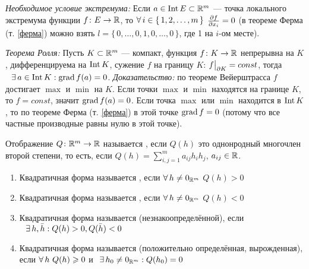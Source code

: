 \begin{slv}[https://www.youtube.com/live/oGN0SkfpZME?si=B74TnyBQXKKDpNlM&t=1691]
	\textit{Необходимое условие экстремума:} Если $a \in \mathrm{Int}\, E \subset \mathbb R^m$ --- точка локального экстремума функции $f\colon E \to \mathbb R$, то $\forall \, i \in \{\, 1, 2, \ldots, m \,\}$ $\frac{\partial f}{\partial x_i} = 0$ (в теореме Ферма (т. \ref{ферма}) можно взять $l = \{\,0, \ldots, 0, 1, 0, \ldots, 0\,\}$, где 1 на $i$-ом месте).
\end{slv}

\begin{slv}[https://www.youtube.com/live/oGN0SkfpZME?si=icr0a6IMCeINfjyk&t=1790]
	\textit{Теорема Ролля:} Пусть $K \subset \mathbb R^m$ --- компакт, функция $f \colon K \to \mathbb R$ непрерывна на $K$, дифференцируема на $\mathrm{Int}\, K$, сужение $f$ на границу $K$: $f\big|_{\partial K}^{} = const$, \smallskip тогда$\E a \in \Int K : \grad f(a) = 0$.\linebreak
	\textit{Доказательство:} по теореме Вейерштрасса $f$ достигает $\max$ и $\min$ на $K$. Если точки $\max$ и $\min$ находятся на границе $K$, то $f = const$, значит $\mathrm{grad\,} f(a) = 0$. Если точка $\max$ или $\min$ находится в $\mathrm{Int}\, K$, то по теореме Ферма (т. \ref{ферма}) в этой точке $\mathrm{grad\,} f = 0$ (потому что все частные производные равны нулю в этой точке). 
\end{slv}

\begin{opr}
	Отображение $Q \colon \mathbb R^m \to \mathbb R$ называется , если $Q(h)$ это однонродный многочлен второй степени, то есть, если $Q(h) = \sum\limits_{i, j = 1}^m a_{ij}h_ih_j$, $a_{ij} \in \mathbb R$.
	\begin{enumerate}
		\item Квадратичная форма называется , если $\forall \, h \ne 0_{\mathbb R^m}$ $Q(h) > 0$
		
		\item Квадратичная форма называется , если $\forall \, h \ne 0_{\mathbb R^m}$ $Q(h) < 0$
		
		\item Квадратичная форма называется  (незнакоопределённой), если$\E h, \bar h : Q(h) > 0, Q(\bar h) < 0$
		
		\item Квадратичная форма называется  (положительно определённая, вырожденная), если $\forall \, h\ Q(h) \geqslant 0$ и$\E h_0 \ne 0_{\rmm} : Q(h_0) = 0$ 
	\end{enumerate}
\end{opr}

